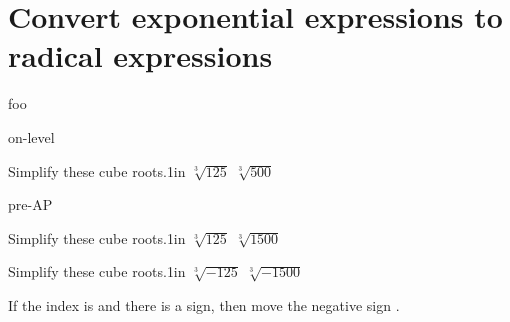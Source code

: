 \section*{Convert exponential expressions to radical expressions}

\begin{myConcept}{foo}
\end{myConcept}

\begin{taggedblock}{on-level}
    \begin{myProblems2}{Simplify these cube roots.}{1in}
        {
            $\sqrt[3]{125}$ 
        }
        {
            $\sqrt[3]{500}$ 
        }
    \end{myProblems2}
\end{taggedblock}
\begin{taggedblock}{pre-AP}
    \begin{myProblems2}{Simplify these cube roots.}{1in}
        {
            $\sqrt[3]{125}$ 
        }
        {
            $\sqrt[3]{1500}$ 
        }
    \end{myProblems2}
\end{taggedblock}
\begin{myProblems2}{Simplify these cube roots.}{1in}
    {
        $\sqrt[3]{-125}$ 
    }
    {
        $\sqrt[3]{-1500}$ 
    }
\end{myProblems2}

\begin{myCenteredBox}[width=6in]
    If the index is  and there is a  sign,
    then move the negative sign .
\end{myCenteredBox}


